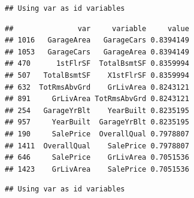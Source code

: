 \documentclass[aoas]{imsart}
\newenvironment{Shaded}{\begin{snugshade}}{\end{snugshade}}
\newcommand{\AttributeTok}[1]{\textcolor[rgb]{0.77,0.63,0.00}{#1}}
\newcommand{\CommentTok}[1]{\textcolor[rgb]{0.56,0.35,0.01}{\textit{#1}}}
\newcommand{\ConstantTok}[1]{\textcolor[rgb]{0.00,0.00,0.00}{#1}}
\newcommand{\DecValTok}[1]{\textcolor[rgb]{0.00,0.00,0.81}{#1}}
\newcommand{\FloatTok}[1]{\textcolor[rgb]{0.00,0.00,0.81}{#1}}
\newcommand{\FunctionTok}[1]{\textcolor[rgb]{0.00,0.00,0.00}{#1}}
\newcommand{\NormalTok}[1]{#1}
\newcommand{\OtherTok}[1]{\textcolor[rgb]{0.56,0.35,0.01}{#1}}
\newcommand{\SpecialCharTok}[1]{\textcolor[rgb]{0.00,0.00,0.00}{#1}}
\newcommand{\StringTok}[1]{\textcolor[rgb]{0.31,0.60,0.02}{#1}}
\numberwithin{equation}{section}
\theoremstyle{plain}
\theoremstyle{remark}
\begin{document}
\begin{verbatim}
## Using var as id variables
\end{verbatim}

\begin{Shaded}
\end{Shaded}

\begin{verbatim}
##               var     variable     value
## 1016   GarageArea   GarageCars 0.8394149
## 1053   GarageCars   GarageArea 0.8394149
## 470      1stFlrSF  TotalBsmtSF 0.8359994
## 507   TotalBsmtSF    X1stFlrSF 0.8359994
## 632  TotRmsAbvGrd    GrLivArea 0.8243121
## 891     GrLivArea TotRmsAbvGrd 0.8243121
## 254   GarageYrBlt    YearBuilt 0.8235195
## 957     YearBuilt  GarageYrBlt 0.8235195
## 190     SalePrice  OverallQual 0.7978807
## 1411  OverallQual    SalePrice 0.7978807
## 646     SalePrice    GrLivArea 0.7051536
## 1423    GrLivArea    SalePrice 0.7051536
\end{verbatim}

\begin{Shaded}
\end{Shaded}

\begin{verbatim}
## Using var as id variables
\end{verbatim}

\begin{Shaded}
\end{Shaded}
\end{document}
